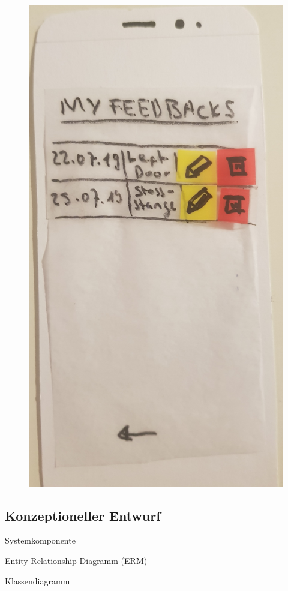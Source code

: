 \begin{figure}[H]
\begin{minipage}{.5\textwidth}
		\label{fig:test1}
	\end{minipage}%
	\begin{minipage}{.5\textwidth}
		\centering
		\includegraphics[width=.8\linewidth]{resources/conception/lowfi_list.jpg}
		\label{fig:test2}
	\end{minipage}
\end{figure}

\subsection{Konzeptioneller Entwurf}

Systemkomponente

Entity Relationship Diagramm (ERM)


Klassendiagramm